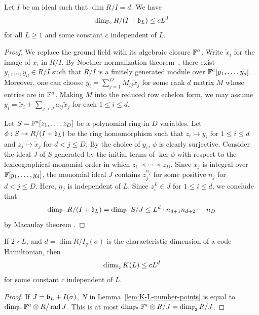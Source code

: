 \begin{lem}
Let $I$ be an ideal such that $\dim R/I = d$. We have
\[
\dim_{\mathbb{F}_2} R / (I+\mathfrak{b}_L) \le cL^d
\]
for all $L \ge 1$ and some constant $c$ independent of $L$.
\end{lem}
\begin{proof}
We replace the ground field with its algebraic closure $\mathbb{F}^a$.
Write $\tilde x_i$ for the image of $x_i$ in $R/I$.
By Noether normalization theorem~\cite[Theorem~13.3]{Eisenbud},
there exist $y_1,\ldots, y_d \in R/I$ such that
$R/I$ is a finitely generated module over $\mathbb{F}^a[y_1,\ldots,y_d]$.
Moreover, one can choose $y_i = \sum_{j=1}^D M_{ij} \tilde x_j$
for some rank $d$ matrix $M$ whose entries are in $\mathbb{F}^a$.
Making $M$ into the reduced row echelon form,
we may assume $y_i = \tilde x_i + \sum_{j>d} a_{ij} \tilde x_j$
for each $1 \le i \le d$.

Let $S=\mathbb{F}^a[z_1,\ldots,z_D]$ be a polynomial ring in $D$ variables.
Let $\phi : S \to R/( I + \mathfrak{b}_L )$ be the ring homomorphism
such that $z_i \mapsto y_i$ for $1 \le i \le d$
and $z_j \mapsto \tilde x_j$ for $ d < j \le D$.
By the choice of $y_i$, $\phi$ is clearly surjective.
Consider the ideal $J$ of $S$ generated by the initial terms of $\ker \phi$ 
with respect to the lexicographical monomial order in which $z_1 \prec \cdots \prec z_D$.
Since $\tilde x_j$ is integral over $\mathbb{F}[y_1,\ldots,y_d]$,
the monomial ideal $J$ contains $z_j^{n_j}$ for some positive $n_j$ for $d < j \le D$.
Here, $n_j$ is independent of $L$.
Since $z_i^L \in J$ for $1 \le i \le d$, we conclude that
\[
 \dim_{\mathbb{F}^a} R/(I+\mathfrak{b}_L) = \dim_{\mathbb{F}^a} S/J \le L^d \cdot n_{d+1} n_{d+2} \cdots n_{D}
\]
by Macaulay theorem \cite[Theorem~15.3]{Eisenbud}.
\end{proof}

\begin{cor}
If $2 \nmid L$, and $d = \dim R/I_q(\sigma)$ is the characteristic dimension of a code Hamiltonian,
then 
\[
 \dim_{\mathbb{F}_2} K(L) \le c L^d
\]
for some constant $c$ independent of $L$.
\label{cor:upper-bound-k}
\end{cor}
\begin{proof}
If $J  = \mathfrak{b}_L + I(\sigma)$,
$N$ in Lemma~\ref{lem:K-L-number-points} is equal to $\dim_{\mathbb{F}^a} \mathbb{F}^a \otimes R /\mathop{\mathrm{rad}} J$.
This is at most $\dim_{\mathbb{F}^a} \mathbb{F}^a \otimes R / J = \dim_{\mathbb{F}_2} R/J$.
\end{proof}

